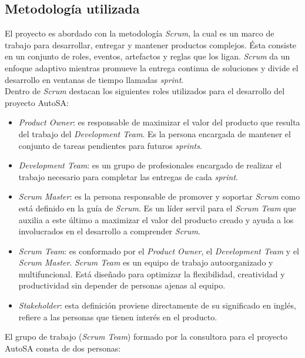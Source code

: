 \subsection{Metodología utilizada}
El proyecto es abordado con la metodología \textit{Scrum}, la cual es un marco de trabajo para desarrollar, entregar y mantener productos complejos. Ésta consiste en un conjunto de roles, eventos, artefactos y reglas que los ligan. \textit{Scrum} da un enfoque adaptivo mientras promueve la entrega continua de soluciones y divide el desarrollo en ventanas de tiempo llamadas \textit{sprint}\cite{scrum}.\\
Dentro de \textit{Scrum} destacan los siguientes roles utilizados para el desarrollo del proyecto AutoSA\cite{scrum}:
\begin{itemize}
	\item \textit{Product Owner}: es responsable de maximizar el valor del producto que resulta del trabajo del \textit{Development Team}. Es la persona encargada de mantener el conjunto de tareas pendientes para futuros \textit{sprints}.
	\item \textit{Development Team}: es un grupo de profesionales encargado de realizar el trabajo necesario para completar las entregas de cada \textit{sprint}.
	\item \textit{Scrum Master}: es la persona responsable de promover y soportar \textit{Scrum} como está definido en la guía de \textit{Scrum}. Es un líder servil para el \textit{Scrum Team} que auxilia a este último a maximizar el valor del producto creado y ayuda a los involucrados en el desarrollo a comprender \textit{Scrum}.
	\item \textit{Scrum Team}: es conformado por el \textit{Product Owner}, el \textit{Development Team} y el \textit{Scrum Master}. \textit{Scrum Team} es un equipo de trabajo autoorganizado y multifuncional. Está diseñado para optimizar la flexibilidad, creatividad y productividad sin depender de personas ajenas al equipo.
	\item \textit{Stakeholder}: esta definición proviene directamente de su significado en inglés, refiere a las personas que tienen interés en el producto.
\end{itemize}
\pagebreak
El grupo de trabajo (\textit{Scrum Team}) formado por la consultora para el proyecto AutoSA consta de dos personas:
